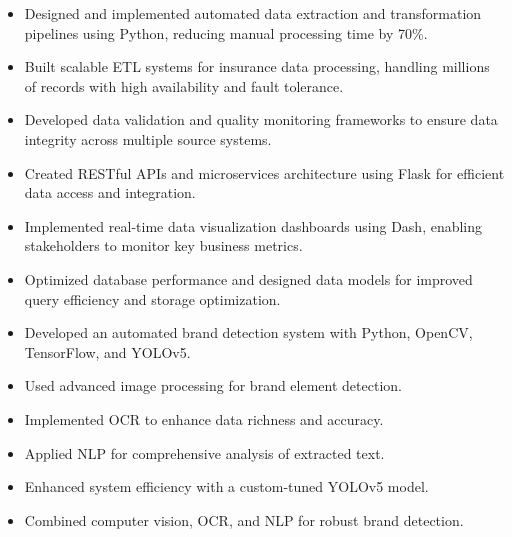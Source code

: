 \documentclass[10pt,a4paper,ragged2e,withhyper]{altacv}
\begin{document}
\begin{itemize}[noitemsep]
\item Designed and implemented automated data extraction and transformation pipelines using Python, reducing manual processing time by 70\%.
\item Built scalable ETL systems for insurance data processing, handling millions of records with high availability and fault tolerance.
\item Developed data validation and quality monitoring frameworks to ensure data integrity across multiple source systems.
\item Created RESTful APIs and microservices architecture using Flask for efficient data access and integration.
\item Implemented real-time data visualization dashboards using Dash, enabling stakeholders to monitor key business metrics.
\item Optimized database performance and designed data models for improved query efficiency and storage optimization.
\end{itemize}

\begin{itemize}[noitemsep]
\item Developed an automated brand detection system with Python, OpenCV, TensorFlow, and YOLOv5.
\item Used advanced image processing for brand element detection.
\item Implemented OCR to enhance data richness and accuracy.
\item Applied NLP for comprehensive analysis of extracted text.
\item Enhanced system efficiency with a custom-tuned YOLOv5 model.
\item Combined computer vision, OCR, and NLP for robust brand detection.
\end{itemize}
\end{document}
